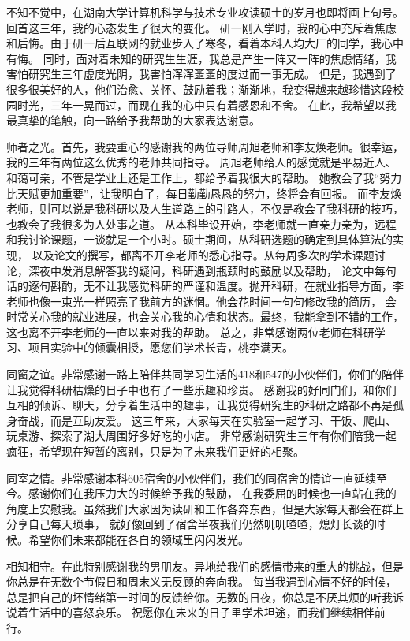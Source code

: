 \begin{acknowledgements}
	不知不觉中，在湖南大学计算机科学与技术专业攻读硕士的岁月也即将画上句号。回首这三年，我的心态发生了很大的变化。
	研一刚入学时，我的心中充斥着焦虑和后悔。由于研一后互联网的就业步入了寒冬，看着本科人均大厂的同学，我心中有悔。
	同时，面对着未知的研究生生涯，我总是产生一阵又一阵的焦虑情绪，我害怕研究生三年虚度光阴，我害怕浑浑噩噩的度过而一事无成。
	但是，我遇到了很多很美好的人，他们治愈、关怀、鼓励着我；渐渐地，我变得越来越珍惜这段校园时光，三年一晃而过，而现在我的心中只有着感恩和不舍。
	在此，我希望以我最真挚的笔触，向一路给予我帮助的大家表达谢意。

	师者之光。首先，我要重心的感谢我的两位导师周旭老师和李友焕老师。很幸运，我的三年有两位这么优秀的老师共同指导。
	周旭老师给人的感觉就是平易近人、和蔼可亲，不管是学业上还是工作上，都给予着我很大的帮助。
	她教会了我“努力比天赋更加重要”，让我明白了，每日勤勤恳恳的努力，终将会有回报。
	而李友焕老师，则可以说是我科研以及人生道路上的引路人，不仅是教会了我科研的技巧，也教会了我很多为人处事之道。
	从本科毕设开始，李老师就一直亲力亲为，远程和我讨论课题，一谈就是一个小时。硕士期间，从科研选题的确定到具体算法的实现，
	以及论文的撰写，都离不开李老师的悉心指导。从每周多次的学术课题讨论，深夜中发消息解答我的疑问，科研遇到瓶颈时的鼓励以及帮助，
	论文中每句话的逐句斟酌，无不让我感觉科研的严谨和温度。抛开科研，在就业指导方面，李老师也像一束光一样照亮了我前方的迷惘。他会花时间一句句修改我的简历，
	会时常关心我的就业进展，也会关心我的心情和状态。最终，我能拿到不错的工作，这也离不开李老师的一直以来对我的帮助。
	总之，非常感谢两位老师在科研学习、项目实验中的倾囊相授，愿您们学术长青，桃李满天。
	
	同窗之谊。非常感谢一路上陪伴共同学习生活的418和547的小伙伴们，你们的陪伴让我觉得科研枯燥的日子中也有了一些乐趣和珍贵。
	感谢我的好同门们，和你们互相的倾诉、聊天，分享着生活中的趣事，让我觉得研究生的科研之路都不再是孤身奋战，而是互助友爱。
	这三年来，大家每天在实验室一起学习、干饭、爬山、玩桌游、探索了湖大周围好多好吃的小店。
	非常感谢研究生三年有你们陪我一起疯狂，希望现在短暂的离别，只是为了未来我们更好的相聚。
	
	同室之情。非常感谢本科605宿舍的小伙伴们，我们的同宿舍的情谊一直延续至今。感谢你们在我压力大的时候给予我的鼓励，
	在我委屈的时候也一直站在我的角度上安慰我。虽然我们大家因为读研和工作各奔东西，但是大家每天都会在群上分享自己每天琐事，
	就好像回到了宿舍半夜我们仍然叽叽喳喳，熄灯长谈的时候。希望你们未来都能在各自的领域里闪闪发光。
	
	相知相守。在此特别感谢我的男朋友。异地给我们的感情带来的重大的挑战，但是你总是在无数个节假日和周末义无反顾的奔向我。
	每当我遇到心情不好的时候，总是把自己的坏情绪第一时间的反馈给你。无数的日夜，你总是不厌其烦的听我诉说着生活中的喜怒哀乐。
	祝愿你在未来的日子里学术坦途，而我们继续相伴前行。


\end{acknowledgements}
